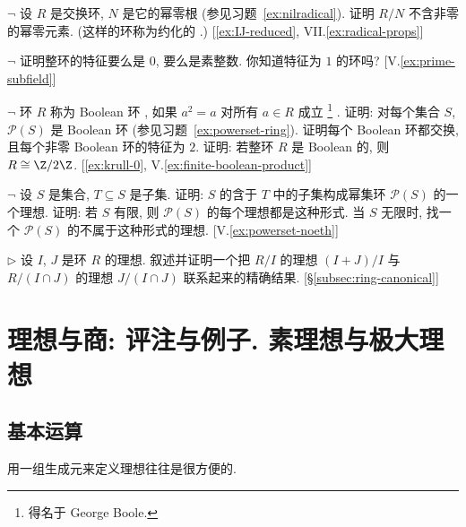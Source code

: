 \begin{prob}
\label{ex:reduced}
$\neg$ 设 $R$ 是交换环, $N$ 是它的幂零根 (参见习题~\ref{ex:nilradical}). 证明 $R/N$ 不含非零的幂零元素. (这样的环称为约化的%
.) [\ref{ex:IJ-reduced}, VII.\ref{ex:radical-props}]
\end{prob}

\begin{prob}
\label{ex:characteristic-prime}
$\neg$ 证明整环的特征要么是 $0$, 要么是素整数. 你知道特征为 $1$ 的环吗? [V.\ref{ex:prime-subfield}]
\end{prob}

\begin{prob}
\label{ex:boolean-ring}
$\neg$ 环 $R$ 称为 Boolean 环%
, 如果 $a^2 = a$ 对所有 $a \in R$ 成立%
\footnote{得名于 George Boole.}%
. 证明: 对每个集合 $S$, $\mathscr{P}(S)$ 是 Boolean 环 (参见习题~\ref{ex:powerset-ring}). 证明每个 Boolean 环都交换, 且每个非零 Boolean 环的特征为 $2$. 证明: 若整环 $R$ 是 Boolean 的, 则 $R \cong \Z/2\Z$. [\ref{ex:krull-0}, V.\ref{ex:finite-boolean-product}]
\end{prob}

\begin{prob}
\label{ex:powerset-ideals}
$\neg$ 设 $S$ 是集合, $T \subseteq S$ 是子集. 证明: $S$ 的含于 $T$ 中的子集构成幂集环 $\mathscr{P}(S)$ 的一个理想. 证明: 若 $S$ 有限, 则 $\mathscr{P}(S)$ 的每个理想都是这种形式. 当 $S$ 无限时, 找一个 $\mathscr{P}(S)$ 的不属于这种形式的理想. [V.\ref{ex:powerset-noeth}]
\end{prob}

\begin{prob}
\label{ex:second-iso-rings}
$\triangleright$ 设 $I$, $J$ 是环 $R$ 的理想. 叙述并证明一个把 $R/I$ 的理想 $(I + J)/I$ 与 $R/(I \cap J)$ 的理想 $J/(I \cap J)$ 联系起来的精确结果. [\S\ref{subsec:ring-canonical}]
\end{prob}

\section{理想与商: 评注与例子. 素理想与极大理想}
\label{subsec:prime-maximal}

\subsection{基本运算}
\label{subsec:ideal-operations}

用一组生成元来定义理想往往是很方便的.

